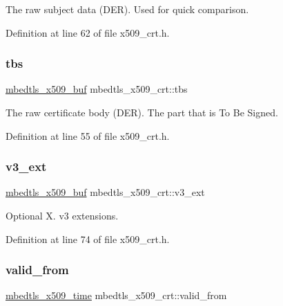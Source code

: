 The raw subject data (D\+ER). Used for quick comparison. 

Definition at line 62 of file x509\+\_\+crt.\+h.

\mbox{\label{structmbedtls__x509__crt_a44e9a884baad5737ef0930af94ca3f94}} 
\subsubsection{\texorpdfstring{tbs}{tbs}}
{\footnotesize\ttfamily \mbox{\hyperlink{group__x509__module_ga4d02c9e8e4e2934555e0d132cd2976dc}{mbedtls\+\_\+x509\+\_\+buf}} mbedtls\+\_\+x509\+\_\+crt\+::tbs}

The raw certificate body (D\+ER). The part that is To Be Signed. 

Definition at line 55 of file x509\+\_\+crt.\+h.

\mbox{\label{structmbedtls__x509__crt_a6baebf9741097506a60521fbcaf5996b}} 
\subsubsection{\texorpdfstring{v3\+\_\+ext}{v3\_ext}}
{\footnotesize\ttfamily \mbox{\hyperlink{group__x509__module_ga4d02c9e8e4e2934555e0d132cd2976dc}{mbedtls\+\_\+x509\+\_\+buf}} mbedtls\+\_\+x509\+\_\+crt\+::v3\+\_\+ext}

Optional X. v3 extensions. 

Definition at line 74 of file x509\+\_\+crt.\+h.

\mbox{\label{structmbedtls__x509__crt_aad3cad5d228545a1950850239741784f}} 
\subsubsection{\texorpdfstring{valid\+\_\+from}{valid\_from}}
{\footnotesize\ttfamily \mbox{\hyperlink{structmbedtls__x509__time}{mbedtls\+\_\+x509\+\_\+time}} mbedtls\+\_\+x509\+\_\+crt\+::valid\+\_\+from}

